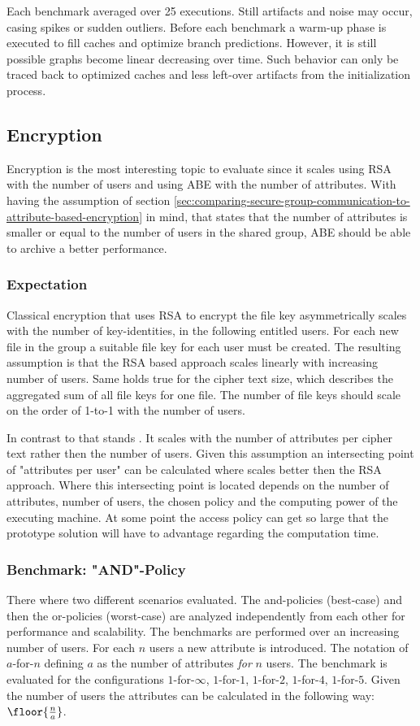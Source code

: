 Each benchmark averaged over 25 executions. Still artifacts and noise may occur, casing spikes or sudden outliers. Before each benchmark a warm-up phase is executed to fill caches and optimize branch predictions. However, it is still possible graphs become linear decreasing over time. Such behavior can only be traced back to optimized caches and less left-over artifacts from the initialization process.

\subsection{Encryption}
Encryption is the most interesting topic to evaluate since it scales using RSA with the number of users and using ABE with the number of attributes. With having the assumption of section \ref{sec:comparing-secure-group-communication-to-attribute-based-encryption} in mind, that states that the number of attributes is smaller or equal to the number of users in the shared group, ABE should be able to archive a better performance. 

\subsubsection{Expectation}
Classical encryption that uses RSA to encrypt the file key asymmetrically scales with the number of key-identities, in the following entitled users. For each new file in the group a suitable file key for each user must be created. The resulting assumption is that the RSA based approach scales linearly with increasing number of users. Same holds true for the cipher text size, which describes the aggregated sum of all file keys for one file. The number of file keys should scale on the order of 1-to-1 with the number of users. 

In contrast to that stands \name. It scales with the number of attributes per cipher text rather then the number of users. Given this assumption an intersecting point of "attributes per user" can be calculated where \name scales better then the RSA approach. Where this intersecting point is located depends on the number of attributes, number of users, the chosen policy and the computing power of the executing machine. At some point the access policy can get so large that the prototype solution will have to advantage regarding the computation time. 

\subsubsection{Benchmark: "AND"-Policy}
There where two different scenarios evaluated. The and-policies (best-case) and then the or-policies (worst-case) are analyzed independently from each other for performance and scalability. The benchmarks are performed over an increasing number of users. For each $n$ users a new attribute is introduced. The notation of $a$-for-$n$ defining $a$ as the number of attributes \textit{for} $n$ users. The benchmark is evaluated for the configurations $1$-for-$\infty$, $1$-for-$1$, $1$-for-$2$, $1$-for-$4$, $1$-for-$5$. Given the number of users the attributes can be calculated in the following way: $\floor{\frac{n}{a}}$. 


